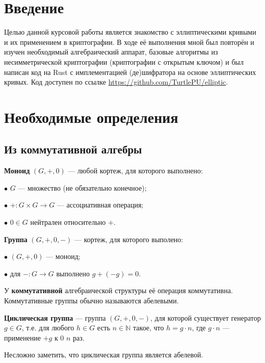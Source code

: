 \documentclass[a4paper,14pt]{extarticle}
\newcommand{\deff}{\vspace{0.2cm} \noindent}
\begin{document}
\newpage

{
    \hypersetup{linkcolor=black}
    \tableofcontents
}

\newpage

\section{Введение}

Целью данной курсовой работы является знакомство с эллиптическими кривыми и их
применением в криптографии. В ходе её выполнения мной был повторён и изучен
необходимый алгебраический аппарат, базовые алгоритмы из несимметрической
криптографии (криптографии с открытым ключом) и был написан код на Rust с
имплементацией (де)шифратора на основе эллиптических кривых. Код доступен по
ссылке \url{https://github.com/TurtlePU/elliptic}.

\newpage

\section{Необходимые определения}

\subsection{Из коммутативной алгебры}

\noindent \textbf{Моноид} $(G, +, 0)$ --- любой кортеж, для которого выполнено:

$\bullet$ $G$ --- множество (не обязательно конечное);

$\bullet$ $+: G \times G \to G$ --- ассоциативная операция;

$\bullet$ $0 \in G$ нейтрален относительно $+$.

\deff \textbf{Группа} $(G, +, 0, -)$ --- кортеж, для которого выполено:

$\bullet$ $(G, +, 0)$ --- моноид;

$\bullet$ для $-: G \to G$ выполнено $g + (-g) = 0$.

\deff У \textbf{коммутативной} алгебраической структуры её операция
коммутативна. Коммутативные группы обычно называются абелевыми.

\deff \textbf{Циклическая группа} --- группа $(G, +, 0, -)$, для которой
существует генератор $g \in G$, т.е. для любого $h \in G$ есть
$n \in \mathbb{N}$ такое, что $h = g \cdot n$, где $g \cdot n$ --- применение
$+ g$ к $0$ $n$ раз.

Несложно заметить, что циклическая группа является абелевой.
\end{document}
